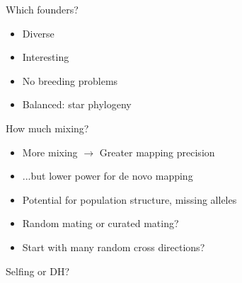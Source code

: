 \documentclass[12pt]{article}
\newcommand{\headsize}{\fontsize{35}{35} \selectfont}
\newcommand{\smallsize}{\fontsize{25}{30} \selectfont}
\begin{document}
{\headsize \color{myyellow}
\hfill \begin{minipage}{5.75in}
\centering
Which founders?
\end{minipage}

\vspace{35mm}

\color{mywhite}
\smallsize

\hfill \begin{minipage}{9.5in}
\begin{itemize}
\itemsep24pt
\item Diverse
\item Interesting
\item No breeding problems
\item Balanced: star phylogeny
\end{itemize}
\end{minipage}


\newpage


\headsize \color{myyellow}
\hfill \begin{minipage}{5.75in}
\centering
How much mixing?
\end{minipage}

\vspace{25mm}

\color{mywhite}
\smallsize

\hfill \begin{minipage}{10in}
\begin{itemize}
\itemsep24pt
\item More mixing $\rightarrow$ Greater mapping precision
\item ...but lower power for de novo mapping
\item Potential for population structure, missing alleles
\color{myblue}
\item Random mating or curated mating?
\item Start with many random cross directions?
\end{itemize}
\end{minipage}


\newpage


\headsize \color{myyellow}
\hfill \begin{minipage}{5.75in}
\centering
Selfing or DH?
\end{minipage}

\vspace{25mm}

}
\end{document}
